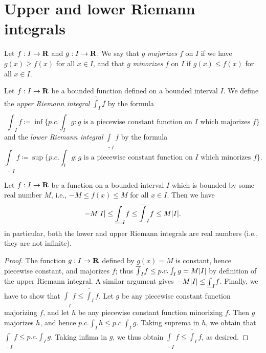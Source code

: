 \section{Upper and lower Riemann integrals}\label{sec 11.3}

\begin{definition}\label{11.3.1}
  Let \(f : I \to \mathbf{R}\) and \(g : I \to \mathbf{R}\).
  We say that \(g\) \emph{majorizes} \(f\) on \(I\) if we have \(g(x) \geq f(x)\) for all \(x \in I\), and that \(g\) \emph{minorizes} \(f\) on \(I\) if \(g(x) \leq f(x)\) for all \(x \in I\).
\end{definition}

\begin{definition}\label{11.3.2}
  Let \(f : I \to \mathbf{R}\) be a bounded function defined on a bounded interval \(I\).
  We define the \emph{upper Riemann integral} \(\overline{\int}_I f\) by the formula
  \[
    \overline{\int}_I f \coloneqq \inf\bigg\{p.c. \int_I g : g \text{ is a piecewise constant function on \(I\) which majorizes } f\bigg\}
  \]
  and the \emph{lower Riemann integral} \(\underline{\int}_I f\) by the formula
  \[
    \underline{\int}_I f \coloneqq \sup\bigg\{p.c. \int_I g : g \text{ is a piecewise constant function on \(I\) which minorizes } f\bigg\}.
  \]
\end{definition}

\begin{lemma}\label{11.3.3}
  Let \(f : I \to \mathbf{R}\) be a function on a bounded interval \(I\) which is bounded by some real number \(M\), i.e., \(-M \leq f(x) \leq M\) for all \(x \in I\).
  Then we have
  \[
    -M \abs{I} \leq \underline{\int}_I f \leq \overline{\int}_I f \leq M \abs{I}.
  \]
  in particular, both the lower and upper Riemann integrals are real numbers (i.e., they are not infinite).
\end{lemma}

\begin{proof}
  The function \(g : I \to \mathbf{R}\) defined by \(g(x) = M\) is constant, hence piecewise constant, and majorizes \(f\);
  thus \(\overline{\int}_I f \leq p.c. \int_I g = M \abs{I}\) by definition of the upper Riemann integral.
  A similar argument gives \(-M \abs{I} \leq \underline{\int}_I f\).
  Finally, we have to show that \(\underline{\int}_I f \leq \overline{\int}_I f\).
  Let \(g\) be any piecewise constant function majorizing \(f\), and let \(h\) be any piecewise constant function minorizing \(f\).
  Then \(g\) majorizes \(h\), and hence \(p.c. \int_I h \leq p.c. \int_I g\).
  Taking suprema in \(h\), we obtain that \(\underline{\int}_I f \leq p.c. \int_I g\).
  Taking infima in \(g\), we thus obtain \(\underline{\int}_I f \leq \overline{\int}_I f\), as desired.
\end{proof}

